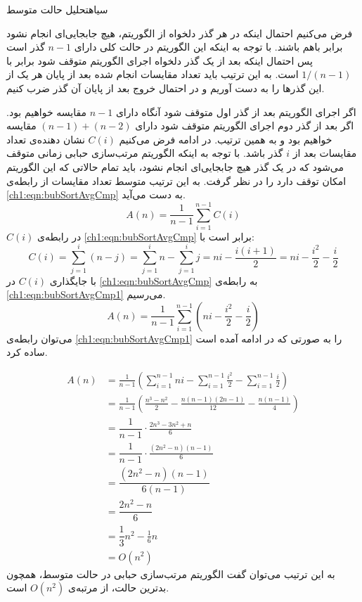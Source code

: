 {‌سیاه{تحلیل حالت متوسط}

فرض می‌کنیم احتمال اینکه در هر گذر دلخواه از الگوریتم، هیچ جابجایی‌ای انجام نشود برابر باهم باشند. با توجه به اینکه این الگوریتم در حالت کلی دارای {$n-1$} گذر است پس احتمال اینکه بعد از یک گذر دلخواه اجرای الگوریتم متوقف شود برابر با {$1/(n-1)$} است. به این ترتیب باید تعداد مقایسات انجام شده بعد از پایان هر یک از این گذرها را به دست آوریم و در احتمال خروج بعد از پایان آن گذر ضرب کنیم. 

اگر اجرای الگوریتم بعد از گذر اول متوقف شود آنگاه دارای {$n-1$} مقایسه خواهیم بود. اگر بعد از گذر دوم اجرای الگوریتم متوقف شود دارای {$(n-1)+(n-2)$} مقایسه خواهیم بود و به همین ترتیب. در ادامه فرض می‌کنیم {$C(i)$} نشان دهنده‌ی تعداد مقایسات بعد از {$i$} گذر باشد. با توجه به اینکه الگوریتم مرتب‌سازی حبابی زمانی متوقف می‌شود که در یک گذر هیچ جابجایی‌ای انجام نشود، باید تمام حالاتی که این الگوریتم امکان توقف دارد را در نظر گرفت. به این ترتیب متوسط تعداد مقایسات از رابطه‌ی {\eqref{ch1:eqn:bubSortAvgCmp}} به دست می‌آید.
\begin{equation}
A(n)=\dfrac{1}{n-1}\sum_{i=1}^{n-1}{C(i)}\label{ch1:eqn:bubSortAvgCmp}
\end{equation}
{$C(i)$} در رابطه‌ی {\eqref{ch1:eqn:bubSortAvgCmp}} برابر است با:
\begin{displaymath}
C(i)=\sum_{j=1}^{i}{(n-j)}=\sum_{j=1}^{i}{n} - \sum_{j=1}^{i}{j}=ni-\dfrac{i(i+1)}{2}=ni - \dfrac{i^2}{2} - \dfrac{i}{2}
\end{displaymath}
با جایگذاری {$C(i)$} در {\eqref{ch1:eqn:bubSortAvgCmp}} به رابطه‌ی {\eqref{ch1:eqn:bubSortAvgCmp1}} می‌رسیم.
\begin{equation}
A(n)=\dfrac{1}{n-1}\sum_{i=1}^{n-1}{\left( ni - \dfrac{i^2}{2} - \dfrac{i}{2} \right) }\label{ch1:eqn:bubSortAvgCmp1}
\end{equation}
می‌توان رابطه‌ی {\eqref{ch1:eqn:bubSortAvgCmp1}} را به صورتی که در ادامه آمده است ساده کرد.

\begin{align*}
A(n) &= \frac{1}{n-1} \left( \sum_{i=1}^{n-1}{ni} - \sum_{i=1}^{n-1}{\frac{i^2}{2}} - \sum_{i=1}^{n-1}{\frac{i}{2}} \right)\\
	 &= \frac{1}{n-1} \left( \frac{n^3-n^2}{2} - \frac{n(n-1)(2n-1)}{12} - \frac{n(n-1)}{4}\right)\\
       &=\dfrac{1}{n-1} \cdot \frac{2n^3-3n^2+n}{6}\\
       &=\dfrac{1}{n-1} \cdot \frac{(2n^2-n)(n-1)}{6}\\
       &=\dfrac{(2n^2-n)(n-1)}{6(n-1)}\\
       &=\dfrac{2n^2-n}{6}\\
       &=\dfrac{1}{3}n^2 -\frac{1}{6}n\\
       &= O(n^2)
\end{align*}
به این ترتیب می‌توان گفت الگوریتم مرتب‌سازی حبابی در حالت متوسط، همچون بدترین حالت، از مرتبه‌ی {$O(n^2)$} است.

}
